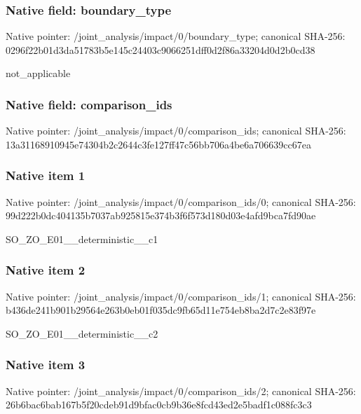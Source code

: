 \documentclass[10pt,a4paper]{article}
\begin{document}
\subsubsection{Native field: boundary\_\allowbreak{}type}
Native pointer: /joint\_\allowbreak{}analysis/impact/0/boundary\_\allowbreak{}type; canonical SHA-256: 0296f22b01d3da51783b5e145c24403c9066251dff0d2f86a33204d0d2b0cd38

\begingroup\raggedright\sloppy not\_\allowbreak{}applicable\par\endgroup

\subsubsection{Native field: comparison\_\allowbreak{}ids}
Native pointer: /joint\_\allowbreak{}analysis/impact/0/comparison\_\allowbreak{}ids; canonical SHA-256: 13a31168910945e74304b2c2644c3fe127ff47c56bb706a4be6a706639cc67ea

\subsubsection{Native item 1}
Native pointer: /joint\_\allowbreak{}analysis/impact/0/comparison\_\allowbreak{}ids/0; canonical SHA-256: 99d222b0dc404135b7037ab925815e374b3f6f573d180d03e4afd9bca7fd90ae

\begingroup\raggedright\sloppy SO\_\allowbreak{}ZO\_\allowbreak{}E01\_\allowbreak{}\_\allowbreak{}deterministic\_\allowbreak{}\_\allowbreak{}c1\par\endgroup

\subsubsection{Native item 2}
Native pointer: /joint\_\allowbreak{}analysis/impact/0/comparison\_\allowbreak{}ids/1; canonical SHA-256: b436de241b901b29564e263b0eb01f035dc9fb65d11e754eb8ba2d7c2e83f97e

\begingroup\raggedright\sloppy SO\_\allowbreak{}ZO\_\allowbreak{}E01\_\allowbreak{}\_\allowbreak{}deterministic\_\allowbreak{}\_\allowbreak{}c2\par\endgroup

\subsubsection{Native item 3}
Native pointer: /joint\_\allowbreak{}analysis/impact/0/comparison\_\allowbreak{}ids/2; canonical SHA-256: 26b6bac6bab167b5f20cdeb91d9bfac0cb9b36e8fcd43ed2e5badf1c088fc3c3
\end{document}
